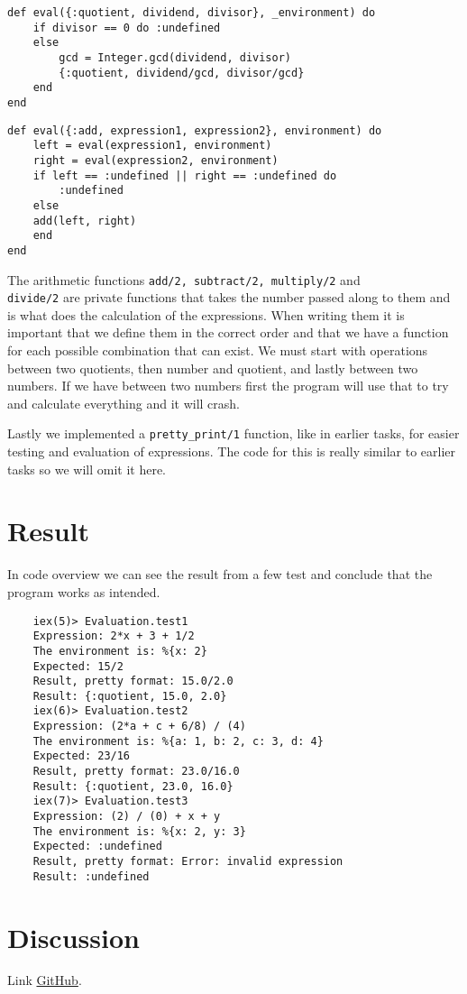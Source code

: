 \documentclass[a4paper,11pt]{article}
\newenvironment{code}{\captionsetup{type=listing}}{}
\begin{document}
\begin{code}
\label{code:evalQuot}
\begin{verbatim}
def eval({:quotient, dividend, divisor}, _environment) do
    if divisor == 0 do :undefined
    else
        gcd = Integer.gcd(dividend, divisor)
        {:quotient, dividend/gcd, divisor/gcd}
    end
end
\end{verbatim}
\end{code}
\begin{code}
\label{code:evalAdd}
\begin{verbatim}
def eval({:add, expression1, expression2}, environment) do
    left = eval(expression1, environment)
    right = eval(expression2, environment)
    if left == :undefined || right == :undefined do
        :undefined
    else
    add(left, right)
    end
end
\end{verbatim}
\end{code}

The arithmetic functions {\tt add/2, subtract/2, multiply/2} and\\ {\tt divide/2} are private functions that takes the number passed along to them and 
is what does the calculation of the expressions. When writing them it is important that we define them in the correct order and that we have a function
for each possible combination that can exist. We must start with operations between two quotients, then number and quotient, and lastly between two numbers. 
If we have between two numbers first the program will use that to try and calculate everything and it will crash. 

Lastly we implemented a {\tt pretty\_print/1} function, like in earlier tasks, for easier testing and evaluation of expressions. The code for this is really similar to 
earlier tasks so we will omit it here.


\section*{Result}
In code overview  we can see the result from a few test and conclude that the program works as intended.
\begin{code}
\label{code:classStructure}
\begin{verbatim}
    iex(5)> Evaluation.test1  
    Expression: 2*x + 3 + 1/2
    The environment is: %{x: 2}
    Expected: 15/2
    Result, pretty format: 15.0/2.0
    Result: {:quotient, 15.0, 2.0}
    iex(6)> Evaluation.test2
    Expression: (2*a + c + 6/8) / (4)
    The environment is: %{a: 1, b: 2, c: 3, d: 4}
    Expected: 23/16
    Result, pretty format: 23.0/16.0
    Result: {:quotient, 23.0, 16.0}
    iex(7)> Evaluation.test3
    Expression: (2) / (0) + x + y
    The environment is: %{x: 2, y: 3}
    Expected: :undefined
    Result, pretty format: Error: invalid expression
    Result: :undefined
\end{verbatim}
\end{code}


\section*{Discussion}
Link
\href{https://github.com/adrian-jonsson-sjoedin/ID1019-Programming-II/tree/main/Task3_Solution}{GitHub}.
\end{document}
